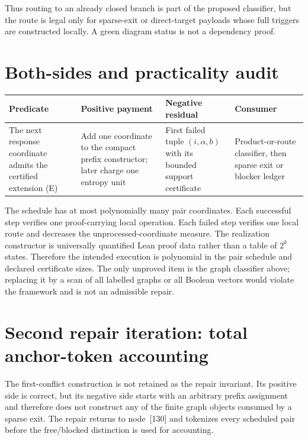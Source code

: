 \documentclass[11pt]{article}
\begin{document}
Thus routing to an already closed branch is part of the proposed classifier,
but the route is legal only for sparse-exit or direct-target payloads whose
full triggers are constructed locally.  A green diagram status is not a
dependency proof.

\section{Both-sides and practicality audit}

\begin{center}
\begin{tabular}{p{}p{}p{}p{}}
\toprule
Predicate & Positive payment & Negative residual & Consumer \\
\midrule
The next response coordinate admits the certified extension (E) & Add one
coordinate to the compact prefix constructor; later charge one entropy unit &
First failed tuple $(i,\alpha,b)$ with its bounded support certificate &
Product-or-route classifier, then sparse exit or blocker ledger \\
\bottomrule
\end{tabular}
\end{center}

The schedule has at most polynomially many pair coordinates.  Each successful
step verifies one proof-carrying local operation.  Each failed step verifies
one local route and decreases the unprocessed-coordinate measure.  The
realization constructor is universally quantified Lean proof data rather than
a table of $2^k$ states.  Therefore the intended execution is polynomial in
the pair schedule and declared certificate sizes.  The only unproved item is
the graph classifier above; replacing it by a scan of all labelled graphs or
all Boolean vectors would violate the framework and is not an admissible
repair.

\section{Second repair iteration: total anchor-token accounting}

The first-conflict construction is not retained as the repair invariant.  Its
positive side is correct, but its negative side starts with an arbitrary
prefix assignment and therefore does not construct any of the finite graph
objects consumed by a sparse exit.  The repair returns to node~[130] and
tokenizes every scheduled pair before the free/blocked distinction is used for
accounting.
\end{document}
